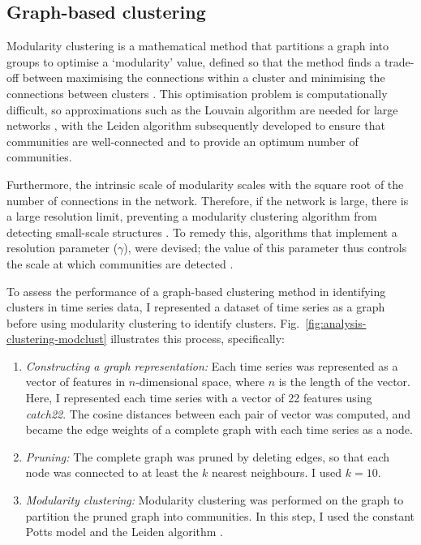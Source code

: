 \subsection{Graph-based clustering}
\label{subsec:analysis-clustering-graphclustering}

Modularity clustering is a mathematical method that partitions a graph into groups to optimise a `modularity' value, defined so that the method finds a trade-off between maximising the connections within a cluster and minimising the connections between clusters \parencite{newmanModularityCommunityStructure2006}.
This optimisation problem is computationally difficult, so approximations such as the Louvain algorithm are needed for large networks \parencite{blondelFastUnfoldingCommunities2008}, with the Leiden algorithm \parencite{traagLouvainLeidenGuaranteeing2019} subsequently developed to ensure that communities are well-connected and to provide an optimum number of communities.

Furthermore, the intrinsic scale of modularity scales with the square root of the number of connections in the network.
Therefore, if the network is large, there is a large resolution limit, preventing a modularity clustering algorithm from detecting small-scale structures \parencite{fortunatoResolutionLimitCommunity2007,traagNarrowScopeResolutionlimitfree2011}.
To remedy this, algorithms that implement a resolution parameter ($\gamma$), were devised; the value of this parameter thus controls the scale at which communities are detected \parencite{reichardtDetectingFuzzyCommunity2004,kumpulaLimitedResolutionComplex2007}.

To assess the performance of a graph-based clustering method in identifying clusters in time series data, I represented a dataset of time series as a graph before using modularity clustering to identify clusters.
Fig.\ \ref{fig:analysis-clustering-modclust} illustrates this process, specifically:
\begin{enumerate}
  \item \emph{Constructing a graph representation:}
        Each time series was represented as a vector of features in $n$-dimensional space, where $n$ is the length of the vector.
        Here, I represented each time series with a vector of 22 features using \textit{catch22}.
        The cosine distances between each pair of vector was computed, and became the edge weights of a complete graph with each time series as a node.
  \item \emph{Pruning:}
        The complete graph was pruned by deleting edges, so that each node was connected to at least the $k$ nearest neighbours.
        I used $k=10$.
  \item \emph{Modularity clustering:}
        Modularity clustering was performed on the graph to partition the pruned graph into communities.
        In this step, I used the constant Potts model \parencite{traagNarrowScopeResolutionlimitfree2011} and the Leiden algorithm \parencite{traagLouvainLeidenGuaranteeing2019}.
\end{enumerate}

